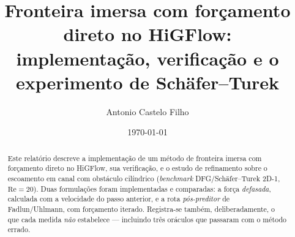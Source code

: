 \documentclass[11pt,a4paper]{article}
\title{Fronteira imersa com forçamento direto no HiGFlow:\\
       implementação, verificação e o experimento de Schäfer--Turek}
\author{Antonio Castelo Filho}
\date{\today}
\begin{document}
\maketitle

\begin{abstract}
Este relatório descreve a implementação de um método de fronteira imersa com
forçamento direto no HiGFlow, sua verificação, e o estudo de refinamento sobre o
escoamento em canal com obstáculo cilíndrico (\emph{benchmark} DFG/Schäfer--Turek
2D-1, $\mathrm{Re}=20$). Duas formulações foram implementadas e comparadas: a
força \emph{defasada}, calculada com a velocidade do passo anterior, e a rota
\emph{pós-preditor} de Fadlun/Uhlmann, com forçamento iterado. Registra-se
também, deliberadamente, o que cada medida \emph{não} estabelece --- incluindo
três oráculos que passaram com o método errado.
\end{abstract}

\tableofcontents
\bigskip











\end{document}
